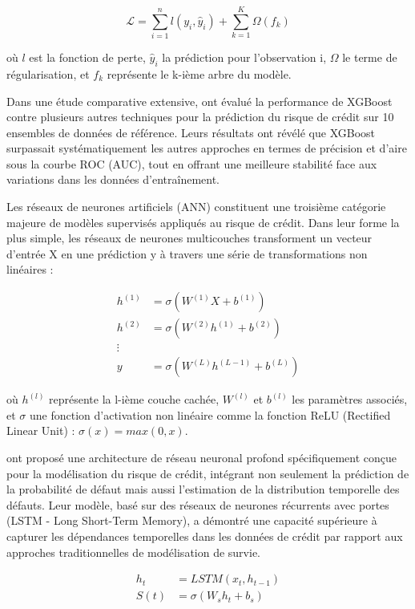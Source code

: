 \begin{equation}
\mathcal{L} = \sum_{i=1}^n l(y_i, \hat{y}_i) + \sum_{k=1}^K \Omega(f_k)
\end{equation}

où $l$ est la fonction de perte, $\hat{y}_i$ la prédiction pour l'observation i, $\Omega$ le terme de régularisation, et $f_k$ représente le k-ième arbre du modèle.

Dans une étude comparative extensive, \citet{xia2017} ont évalué la performance de XGBoost contre plusieurs autres techniques pour la prédiction du risque de crédit sur 10 ensembles de données de référence. Leurs résultats ont révélé que XGBoost surpassait systématiquement les autres approches en termes de précision et d'aire sous la courbe ROC (AUC), tout en offrant une meilleure stabilité face aux variations dans les données d'entraînement.

Les réseaux de neurones artificiels (ANN) constituent une troisième catégorie majeure de modèles supervisés appliqués au risque de crédit. Dans leur forme la plus simple, les réseaux de neurones multicouches transforment un vecteur d'entrée X en une prédiction y à travers une série de transformations non linéaires :

\begin{align}
h^{(1)} &= \sigma(W^{(1)}X + b^{(1)}) \\
h^{(2)} &= \sigma(W^{(2)}h^{(1)} + b^{(2)}) \\
\vdots \\
y &= \sigma(W^{(L)}h^{(L-1)} + b^{(L)})
\end{align}

où $h^{(l)}$ représente la l-ième couche cachée, $W^{(l)}$ et $b^{(l)}$ les paramètres associés, et $\sigma$ une fonction d'activation non linéaire comme la fonction ReLU (Rectified Linear Unit) : $\sigma(x) = max(0, x)$.

\citet{kvamme2018} ont proposé une architecture de réseau neuronal profond spécifiquement conçue pour la modélisation du risque de crédit, intégrant non seulement la prédiction de la probabilité de défaut mais aussi l'estimation de la distribution temporelle des défauts. Leur modèle, basé sur des réseaux de neurones récurrents avec portes (LSTM - Long Short-Term Memory), a démontré une capacité supérieure à capturer les dépendances temporelles dans les données de crédit par rapport aux approches traditionnelles de modélisation de survie.

\begin{align}
h_t &= LSTM(x_t, h_{t-1})\\
S(t) &= \sigma(W_s h_t + b_s)
\end{align}

